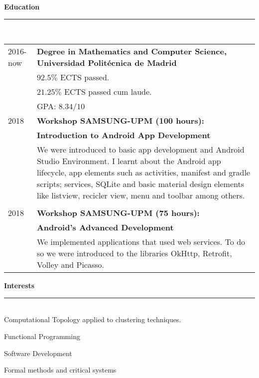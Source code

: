 \documentclass{article}
\begin{document}
\begin{minipage}[c]{0.66\linewidth}
  \textbf{\Large{\color{BlueViolet}Education}}\\[-0.25cm]
  {\color{BlueViolet} \rule{\linewidth}{0.1mm} }\\[-0.25cm]
  \begin{tabular}{l l}
    \multicolumn{1}{p{0.6cm}}{2016-now}& \multicolumn{1}{p{8.4cm}}{\textbf{Degree in Mathematics and Computer Science, Universidad Politécnica de Madrid} }\\
         & \normalsize \quad $92.5\%$ ECTS passed.\\
            & \normalsize \quad $21.25\%$ ECTS passed cum laude.\\
         & \normalsize \quad GPA: $8.34/10$ \\[0.3cm]
    2018 & \textbf{Workshop SAMSUNG-UPM (100 hours):} \\ & \textbf{Introduction to Android App Development} \\
         & \multicolumn{1}{p{11cm}}{\normalsize We were introduced to basic app development and Android Studio Environment. I learnt about the Android app lifecycle, app elements such as activities, manifest and gradle scripts; services, SQLite and basic material design elements like listview, recicler view, menu and toolbar among others.} \\ \\[-0.12cm]
    2018 & \textbf{Workshop SAMSUNG-UPM (75 hours):} \\ & \textbf{Android's Advanced Development} \\
         & \multicolumn{1}{p{11cm}}{\normalsize We implemented applications that used web services. To do so we were introduced to the libraries OkHttp, Retrofit, Volley and Picasso.} \\
  \end{tabular}
  \vspace{0.3cm}
  
  \textbf{\Large{\color{BlueViolet}Interests}}\\[-0.25cm]
  {\color{BlueViolet} \rule{\linewidth}{0.1mm} }\\[-0.25cm]
  Computational Topology applied to clustering techniques.

  Functional Programming

  Software Development

  Formal methods and critical systems
  
\end{minipage}
\end{document}
